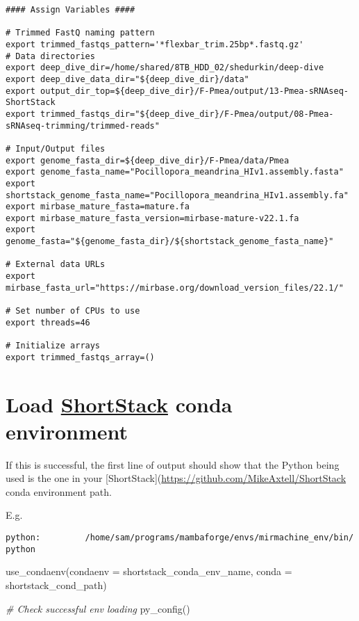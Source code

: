 \documentclass[
]{article}
\newenvironment{Shaded}{\begin{snugshade}}{\end{snugshade}}
\newcommand{\AttributeTok}[1]{\textcolor[rgb]{0.77,0.63,0.00}{#1}}
\newcommand{\CommentTok}[1]{\textcolor[rgb]{0.56,0.35,0.01}{\textit{#1}}}
\newcommand{\FunctionTok}[1]{\textcolor[rgb]{0.00,0.00,0.00}{#1}}
\newcommand{\NormalTok}[1]{#1}
\begin{document}
\begin{verbatim}
#### Assign Variables ####

# Trimmed FastQ naming pattern
export trimmed_fastqs_pattern='*flexbar_trim.25bp*.fastq.gz'
# Data directories
export deep_dive_dir=/home/shared/8TB_HDD_02/shedurkin/deep-dive
export deep_dive_data_dir="${deep_dive_dir}/data"
export output_dir_top=${deep_dive_dir}/F-Pmea/output/13-Pmea-sRNAseq-ShortStack
export trimmed_fastqs_dir="${deep_dive_dir}/F-Pmea/output/08-Pmea-sRNAseq-trimming/trimmed-reads"

# Input/Output files
export genome_fasta_dir=${deep_dive_dir}/F-Pmea/data/Pmea
export genome_fasta_name="Pocillopora_meandrina_HIv1.assembly.fasta"
export shortstack_genome_fasta_name="Pocillopora_meandrina_HIv1.assembly.fa"
export mirbase_mature_fasta=mature.fa
export mirbase_mature_fasta_version=mirbase-mature-v22.1.fa
export genome_fasta="${genome_fasta_dir}/${shortstack_genome_fasta_name}"

# External data URLs
export mirbase_fasta_url="https://mirbase.org/download_version_files/22.1/"

# Set number of CPUs to use
export threads=46

# Initialize arrays
export trimmed_fastqs_array=()
\end{verbatim}

\hypertarget{load-shortstack-conda-environment}{%
\section{\texorpdfstring{Load \href{https://github.com/MikeAxtell/ShortStack}{ShortStack} conda environment}{Load ShortStack conda environment}}\label{load-shortstack-conda-environment}}

If this is successful, the first line of output should show that the Python being used is the one in your {[}ShortStack{]}(\url{https://github.com/MikeAxtell/ShortStack} conda environment path.

E.g.

\texttt{python:\ \ \ \ \ \ \ \ \ /home/sam/programs/mambaforge/envs/mirmachine\_env/bin/python}

\begin{Shaded}
\begin{Highlighting}[]
\FunctionTok{use\_condaenv}\NormalTok{(}\AttributeTok{condaenv =}\NormalTok{ shortstack\_conda\_env\_name, }\AttributeTok{conda =}\NormalTok{ shortstack\_cond\_path)}

\CommentTok{\# Check successful env loading}
\FunctionTok{py\_config}\NormalTok{()}
\end{Highlighting}
\end{Shaded}
\end{document}
